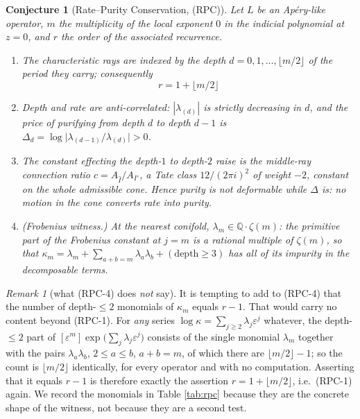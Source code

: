 \documentclass[11pt,reqno]{amsart}
\theoremstyle{plain}
\newtheorem{conjecture}[theorem]{Conjecture}
\theoremstyle{definition}
\theoremstyle{remark}
\newtheorem{remark}[theorem]{Remark}
\newcommand{\QQ}{\mathbb{Q}}
\newcommand{\eps}{\varepsilon}
\newcommand{\Ihat}{\widehat{I}}
\begin{document}
\begin{conjecture}[Rate--Purity Conservation, (RPC)]\label{conj:rpc}
Let $L$ be an Ap\'ery-like operator, $m$ the multiplicity of the local exponent $0$ in the
indicial polynomial at $z=0$, and $r$ the order of the associated recurrence.
\begin{enumerate}[label=\textup{(RPC-\arabic*)},leftmargin=3.4em]
\item The characteristic rays are indexed by the \emph{depth} $d=0,1,\dots,\lfloor m/2\rfloor$ of
the period they carry; consequently
\[
  \boxed{\;r=1+\lfloor m/2\rfloor\;}
\]
\item Depth and rate are anti-correlated: $|\lambda_{(d)}|$ is strictly decreasing in $d$, and
the price of purifying from depth $d$ to depth $d-1$ is
$\Delta_d=\log\bigl|\lambda_{(d-1)}/\lambda_{(d)}\bigr|>0$.
\item The constant effecting the depth-$1$ to depth-$2$ raise is the middle-ray connection ratio
$c=A_{\Ihat}/A_{I'}$, a Tate class $12/(2\pi i)^2$ of weight $-2$, constant on the whole
admissible cone. Hence purity is not deformable while $\Delta$ is: no motion in the cone converts
rate into purity.
\item \emph{(Frobenius witness.)} At the nearest conifold, $\lambda_m\in\QQ\cdot\zeta(m)$: the
primitive part of the Frobenius constant at $j=m$ is a rational multiple of $\zeta(m)$, so that
$\kappa_m=\lambda_m+\sum_{a+b=m}\lambda_a\lambda_b+(\text{depth}\ge3)$ has all of its impurity
in the decomposable terms.
\end{enumerate}
\end{conjecture}

\begin{remark}[what (RPC-4) does \emph{not} say]\label{rem:rpc4}
It is tempting to add to (RPC-4) that the number of depth-$\le2$ monomials of $\kappa_m$ equals
$r-1$. That would carry no content beyond (RPC-1). For \emph{any} series
$\log\kappa=\sum_{j\ge2}\lambda_j\eps^j$ whatever, the depth-$\le2$ part of
$[\eps^m]\exp\bigl(\sum_j\lambda_j\eps^j\bigr)$ consists of the single monomial $\lambda_m$
together with the pairs $\lambda_a\lambda_b$, $2\le a\le b$, $a+b=m$, of which there are
$\lfloor m/2\rfloor-1$; so the count is $\lfloor m/2\rfloor$ identically, for every operator and
with no computation. Asserting that it equals $r-1$ is therefore exactly the assertion
$r=1+\lfloor m/2\rfloor$, i.e.\ (RPC-1) again. We record the monomials in
Table \ref{tab:rpc} because they are the concrete shape of the witness, not because they are a
second test.
\end{remark}
\end{document}
